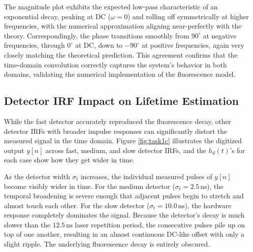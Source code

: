 \documentclass[conference]{IEEEtran}
\begin{document}
The magnitude plot exhibits the expected low-pass characteristic of an exponential decay, peaking at DC ($\omega = 0$) and rolling off symmetrically at higher frequencies, with the numerical approximation aligning near-perfectly with the theory.
Correspondingly, the phase transitions smoothly from $90^\circ$ at negative frequencies, through $0^\circ$ at DC, down to $-90^\circ$ at positive frequencies, again very closely matching the theoretical prediction.
This agreement confirms that the time-domain convolution correctly captures the system's behavior in both domains, validating the numerical implementation of the fluorescence model.


\subsection{Detector IRF Impact on Lifetime Estimation}
While the fast detector accurately reproduced the fluorescence decay, other detector IRFs with broader impulse responses can significantly distort the measured signal in the time domain.
Figure \ref{fig:task1c} illustrates the digitized output $y[n]$ across fast, medium, and slow detector IRFs, and the $h_d(t)$'s for each case show how they get wider in time.

As the detector width $\sigma_t$ increases, the individual measured pulses of $y[n]$ become visibly wider in time. For the medium detector ($\sigma_t = 2.5\,\text{ns}$),
the temporal broadening is severe enough that adjacent pulses begin to stretch and almost touch each other. For the slow detector ($\sigma_t = 10.0\,\text{ns}$), the hardware response completely dominates the signal.
Because the detector's decay is much slower than the $12.5\,\text{ns}$ laser repetition period, the consecutive pulses pile up on top of one another, resulting in an almost continuous DC-like offset with only a slight ripple.
The underlying fluorescence decay is entirely obscured.
\end{document}
